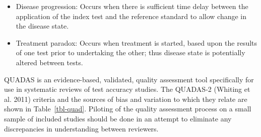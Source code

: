 \documentclass[
  10pt,
  a4paper,
  DIV=11,
  numbers=noendperiod]{scrreprt}
\begin{document}
\begin{itemize}
  \begin{itemize}
  \item
    Disease progression: Occurs when there is sufficient time delay
    between the application of the index test and the reference standard
    to allow change in the disease state.
  \item
    Treatment paradox: Occurs when treatment is started, based upon the
    results of one test prior to undertaking the other; thus disease
    state is potentially altered between tests.
  \end{itemize}
\end{itemize}

QUADAS is an evidence-based, validated, quality assessment tool
specifically for use in systematic reviews of test accuracy studies. The
QUADAS-2 (Whiting et al. 2011) criteria and the sources of bias and
variation to which they relate are shown in Table~\ref{tbl-quad}.
Piloting of the quality assessment process on a small sample of included
studies should be done in an attempt to eliminate any discrepancies in
understanding between reviewers.
\end{document}
